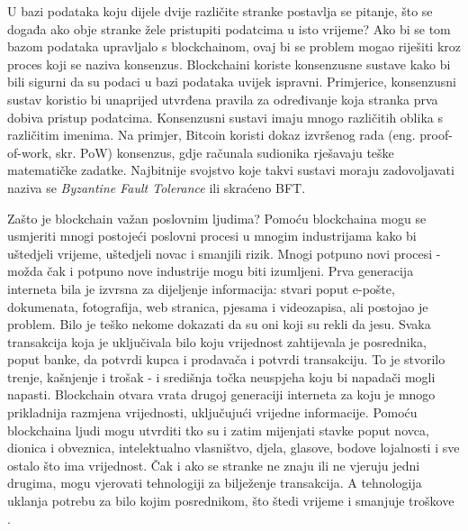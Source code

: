 \documentclass[times, utf8, diplomski]{fer}
\begin{document}
U bazi podataka koju dijele dvije različite stranke postavlja se pitanje, što se događa ako obje stranke žele pristupiti podatcima u isto vrijeme? Ako bi se tom bazom podataka upravljalo s blockchainom, ovaj bi se problem mogao riješiti kroz proces koji se naziva konsenzus. Blockchaini koriste konsenzusne sustave kako bi bili sigurni da su podaci u bazi podataka uvijek ispravni. Primjerice, konsenzusni sustav koristio bi unaprijed utvrđena pravila za određivanje koja stranka prva dobiva pristup podatcima. Konsenzusni sustavi imaju mnogo različitih oblika s različitim imenima. Na primjer, Bitcoin koristi dokaz izvršenog rada (eng. proof-of-work, skr. PoW) konsenzus, gdje računala sudionika rješavaju teške matematičke zadatke. Najbitnije svojstvo koje takvi sustavi moraju zadovoljavati naziva se \textit{Byzantine Fault Tolerance} ili skraćeno BFT. 

Zašto je blockchain važan poslovnim ljudima? Pomoću blockchaina mogu se usmjeriti mnogi postojeći poslovni procesi u mnogim industrijama kako bi uštedjeli vrijeme, uštedjeli novac i smanjili rizik. Mnogi potpuno novi procesi - možda čak i potpuno nove industrije mogu biti izumljeni. Prva generacija interneta bila je izvrsna za dijeljenje informacija: stvari poput e-pošte, dokumenata, fotografija, web stranica, pjesama i videozapisa, ali postojao je problem. Bilo je teško nekome dokazati da su oni koji su rekli da jesu. Svaka transakcija koja je uključivala bilo koju vrijednost zahtijevala je posrednika, poput banke, da potvrdi kupca i prodavača i potvrdi transakciju. To je stvorilo trenje, kašnjenje i trošak - i središnja točka neuspjeha koju bi napadači mogli napasti. Blockchain otvara vrata drugoj generaciji interneta za koju je mnogo prikladnija razmjena vrijednosti, uključujući vrijedne informacije. Pomoću blockchaina ljudi mogu utvrditi tko su i zatim mijenjati stavke poput novca, dionica i obveznica, intelektualno vlasništvo, djela, glasove, bodove lojalnosti i sve ostalo što ima vrijednost. Čak i ako se stranke ne znaju ili ne vjeruju jedni drugima, mogu vjerovati tehnologiji za bilježenje transakcija. A tehnologija uklanja potrebu za bilo kojim posrednikom, što štedi vrijeme i smanjuje troškove \cite{intro}.
\end{document}

